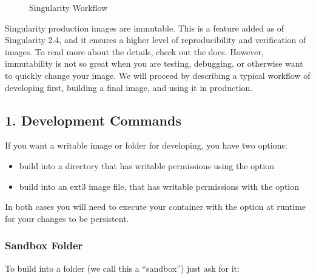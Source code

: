 \documentclass[letterpaper,10pt,english]{sphinxmanual}
\begin{document}
\begin{figure}[htbp]
\centering
\capstart

\noindent{}
\caption{Singularity Workflow}\label{\detokenize{singularity_flow:id2}}\end{figure}

Singularity production images are immutable. This is a feature added as
of Singularity 2.4, and it ensures a higher level of reproducibility and
verification of images. To read more about the details, check out the {\hyperref[\detokenize{build_a_container:build-a-container}]{}}
docs. However, immutability is not so great when you are testing,
debugging, or otherwise want to quickly change your image. We will
proceed by describing a typical workflow of developing first, building a
final image, and using it in production.


\subsection{1. Development Commands}
\label{\detokenize{singularity_flow:development-commands}}
If you want a writable image or folder for developing, you have two
options:
\begin{itemize}
\item {} 
build into a directory that has writable permissions using the  option

\item {} 
build into an ext3 image file, that has writable permissions with the 
option

\end{itemize}

In both cases you will need to execute your container with the  option at
runtime for your changes to be persistent.


\subsubsection{Sandbox Folder}
\label{\detokenize{singularity_flow:sandbox-folder}}
To build into a folder (we call this a “sandbox”) just ask for it:
\end{document}

